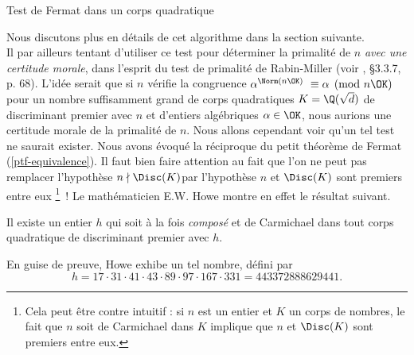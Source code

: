 \vspace{1em}
\begin{algorithm}[H]\label{test-Fermat-quadratique}
\caption{Test de Fermat dans un corps quadratique}
\end{algorithm}
\vspace{1em}

Nous discutons plus en détails de cet algorithme dans la section suivante. \\

Il par ailleurs tentant d'utiliser ce test pour déterminer la primalité de $n$ \emph{avec une certitude morale}, dans l'esprit du  test de primalité de Rabin-Miller (voir \cite{Demazure}, §3.3.7, p. 68). L'idée serait que si $n$ vérifie la congruence $\alpha^{\Norm(n\OK)} \equiv \alpha \pmod{n\OK}$ pour un nombre \og suffisamment grand \fg{} de corps quadratiques $K = \Q(\sqrt{d})$ de discriminant premier avec $n$ et d'entiers algébriques $\alpha \in \OK$, nous aurions une certitude morale de la primalité de $n$. Nous allons cependant voir qu'un tel test ne saurait exister. Nous avons évoqué la réciproque du petit théorème de Fermat (\ref{ptf-equivalence}). Il faut bien faire attention au fait que l'on ne peut pas remplacer l'hypothèse \og $n \nmid \Disc(K)$\fg par l'hypothèse \og $n$ et $\Disc(K)$ sont premiers entre eux \fg \footnote{Cela peut être contre intuitif : si $n$ est un entier et $K$ un corps de nombres, le fait que $n$ soit de Carmichael dans $K$ implique que $n$ et $\Disc(K)$ sont premiers entre eux.}~! Le mathématicien E.W. Howe montre en effet le résultat suivant.

\begin{theoreme}[Howe, 2000]
	Il existe un entier $h$ qui soit à la fois \emph{composé} et de Carmichael dans tout corps quadratique de discriminant premier avec $h$.
\end{theoreme}

En guise de preuve, Howe exhibe un tel nombre, défini par
	\begin{equation}\label{Howe}
		h = 17 \cdot 31 \cdot 41 \cdot 43 \cdot 89 \cdot 97 \cdot 167 \cdot 331 = 443372888629441.
	\end{equation}

